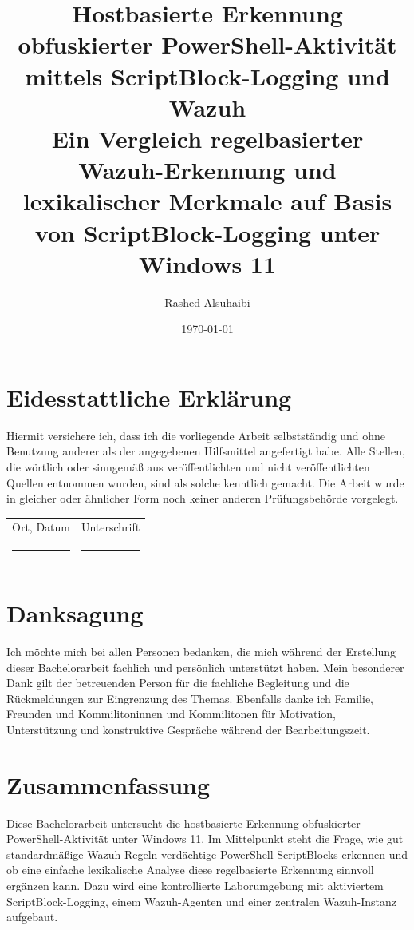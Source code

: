 \documentclass[12pt,a4paper,oneside,parskip=half]{scrreprt}
\title{Hostbasierte Erkennung obfuskierter PowerShell-Aktivität mittels ScriptBlock-Logging und Wazuh \\[1ex] \large
Ein Vergleich regelbasierter Wazuh-Erkennung und lexikalischer Merkmale auf Basis von ScriptBlock-Logging unter Windows 11}
\author{Rashed Alsuhaibi}
\date{\today}
\begin{document}
\maketitle

\chapter*{Eidesstattliche Erklärung}
Hiermit versichere ich, dass ich die vorliegende Arbeit selbstständig und ohne Benutzung anderer als der angegebenen Hilfsmittel angefertigt habe. Alle Stellen, die wörtlich oder sinngemäß aus veröffentlichten und nicht veröffentlichten Quellen entnommen wurden, sind als solche kenntlich gemacht. Die Arbeit wurde in gleicher oder ähnlicher Form noch keiner anderen Prüfungsbehörde vorgelegt.

\vspace{2cm}
\begin{tabular}{p{6cm}p{6cm}}
Ort, Datum & Unterschrift\\[1.2cm]
\rule{6cm}{0.4pt} & \rule{6cm}{0.4pt}
\end{tabular}
\clearpage

\chapter*{Danksagung}
Ich möchte mich bei allen Personen bedanken, die mich während der Erstellung dieser Bachelorarbeit fachlich und persönlich unterstützt haben. Mein besonderer Dank gilt der betreuenden Person für die fachliche Begleitung und die Rückmeldungen zur Eingrenzung des Themas. Ebenfalls danke ich Familie, Freunden und Kommilitoninnen und Kommilitonen für Motivation, Unterstützung und konstruktive Gespräche während der Bearbeitungszeit.
\clearpage

\chapter*{Zusammenfassung}
Diese Bachelorarbeit untersucht die hostbasierte Erkennung obfuskierter PowerShell-Aktivität unter Windows 11. Im Mittelpunkt steht die Frage, wie gut standardmäßige Wazuh-Regeln verdächtige PowerShell-ScriptBlocks erkennen und ob eine einfache lexikalische Analyse diese regelbasierte Erkennung sinnvoll ergänzen kann. Dazu wird eine kontrollierte Laborumgebung mit aktiviertem ScriptBlock-Logging, einem Wazuh-Agenten und einer zentralen Wazuh-Instanz aufgebaut.
\end{document}
